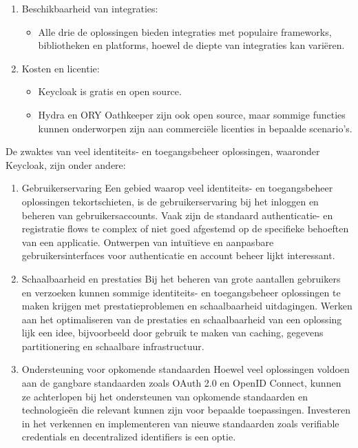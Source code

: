 \begin{enumerate}
  \item Beschikbaarheid van integraties:
  \begin{itemize}
    \item Alle drie de oplossingen bieden integraties met populaire frameworks, bibliotheken en platforms, hoewel de diepte van integraties kan variëren.
  \end{itemize}
  
  \item Kosten en licentie:
  \begin{itemize}
    \item Keycloak is gratis en open source.
    \item Hydra en ORY Oathkeeper zijn ook open source, maar sommige functies kunnen onderworpen zijn aan commerciële licenties in bepaalde scenario's.
  \end{itemize}
\end{enumerate}

De zwaktes van veel identiteits- en toegangsbeheer oplossingen, waaronder Keycloak, zijn onder andere:

\begin{enumerate}
  \item Gebruikerservaring
  Een gebied waarop veel identiteits- en toegangsbeheer oplossingen tekortschieten, is de gebruikerservaring bij het inloggen en beheren van gebruikersaccounts. Vaak zijn de standaard authenticatie- en registratie flows te complex of niet goed afgestemd op de specifieke behoeften van een applicatie. Ontwerpen van intuïtieve en aanpasbare gebruikersinterfaces voor authenticatie en account beheer lijkt interessant.
  
  \item Schaalbaarheid en prestaties
  Bij het beheren van grote aantallen gebruikers en verzoeken kunnen sommige identiteits- en toegangsbeheer oplossingen te maken krijgen met prestatieproblemen en schaalbaarheid uitdagingen. Werken aan het optimaliseren van de prestaties en schaalbaarheid van een oplossing lijk een idee, bijvoorbeeld door gebruik te maken van caching, gegevens partitionering en schaalbare infrastructuur.
  
  \item Ondersteuning voor opkomende standaarden
  Hoewel veel oplossingen voldoen aan de gangbare standaarden zoals OAuth 2.0 en OpenID Connect, kunnen ze achterlopen bij het ondersteunen van opkomende standaarden en technologieën die relevant kunnen zijn voor bepaalde toepassingen. Investeren in het verkennen en implementeren van nieuwe standaarden zoals verifiable credentials en decentralized identifiers is een optie.
\end{enumerate}


